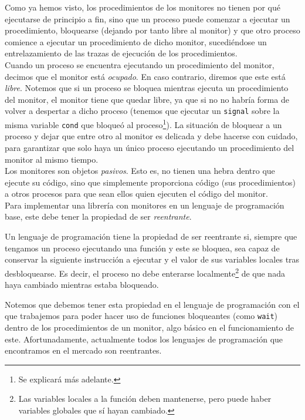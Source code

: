 Como ya hemos visto, los procedimientos de los monitores no tienen por qué ejecutarse de principio a fin, sino que un proceso puede comenzar a ejecutar un procedimiento, bloquearse (dejando por tanto libre al monitor) y que otro proceso comience a ejecutar un procedimiento de dicho monitor, sucediéndose un entrelazamiento de las trazas de ejecución de los procedimientos.\\

Cuando un proceso se encuentra ejecutando un procedimiento del monitor, decimos que el monitor está \emph{ocupado}. En caso contrario, diremos que este está \emph{libre}. Notemos que si un proceso se bloquea mientras ejecuta un procedimiento del monitor, el monitor tiene que quedar libre, ya que si no no habría forma de volver a despertar a dicho proceso (tenemos que ejecutar un \verb|signal| sobre la misma variable \verb|cond| que bloqueó al proceso\footnote{Se explicará más adelante.}). La situación de bloquear a un proceso y dejar que entre otro al monitor es delicada y debe hacerse con cuidado, para garantizar que solo haya un único proceso ejecutando un procedimiento del monitor al mismo tiempo.\\

Los monitores son objetos \emph{pasivos}. Esto es, no tienen una hebra dentro que ejecute su código, sino que simplemente proporciona código (sus procedimientos) a otros procesos para que sean ellos quien ejecuten el código del monitor.\\

Para implementar una librería con monitores en un lenguaje de programación base, este debe tener la propiedad de ser \emph{reentrante}.
\begin{definicion}
    Un lenguaje de programación tiene la propiedad de ser reentrante si, siempre que tengamos un proceso ejecutando una función y este se bloquea, sea capaz de conservar la siguiente instrucción a ejecutar y el valor de sus variables locales tras desbloquearse. Es decir, el proceso no debe enterarse localmente\footnote{Las variables locales a la función deben mantenerse, pero puede haber variables globales que sí hayan cambiado.} de que nada haya cambiado mientras estaba bloqueado.
\end{definicion}
Notemos que debemos tener esta propiedad en el lenguaje de programación con el que trabajemos para poder hacer uso de funciones bloqueantes (como \verb|wait|) dentro de los procedimientos de un monitor, algo básico en el funcionamiento de este. Afortunadamente, actualmente todos los lenguajes de programación que encontramos en el mercado son reentrantes.\\

